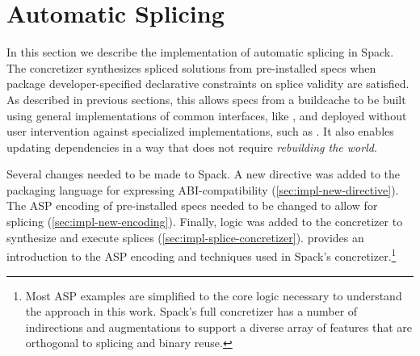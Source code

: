 \section{Automatic Splicing}
\label{sec:implementation}
In this section we describe the implementation of automatic splicing in Spack.
The concretizer synthesizes spliced solutions from pre-installed specs when
package developer-specified declarative constraints on splice validity are
satisfied. As described in previous sections, this allows specs from a
buildcache to be built using general implementations of common interfaces, like
, and deployed without user intervention against specialized
implementations, such as .  It also enables updating
dependencies in a way that does not require \emph{rebuilding the world}.

Several changes needed to be made to Spack. A new directive was added
to the packaging language for expressing
ABI-compatibility (\cref{sec:impl-new-directive}). The ASP encoding of
pre-installed specs needed to be changed to allow for splicing (\cref{sec:impl-new-encoding}).
Finally, logic was added to the concretizer to synthesize and execute splices
(\cref{sec:impl-splice-concretizer}).  provides an
introduction to the ASP encoding and techniques used in Spack's
concretizer.\footnote{Most ASP examples are simplified to the core logic
  necessary to understand the approach in this work. Spack's full concretizer
  has a number of indirections and augmentations to support a diverse array of
  features that are orthogonal to splicing and binary reuse.}

